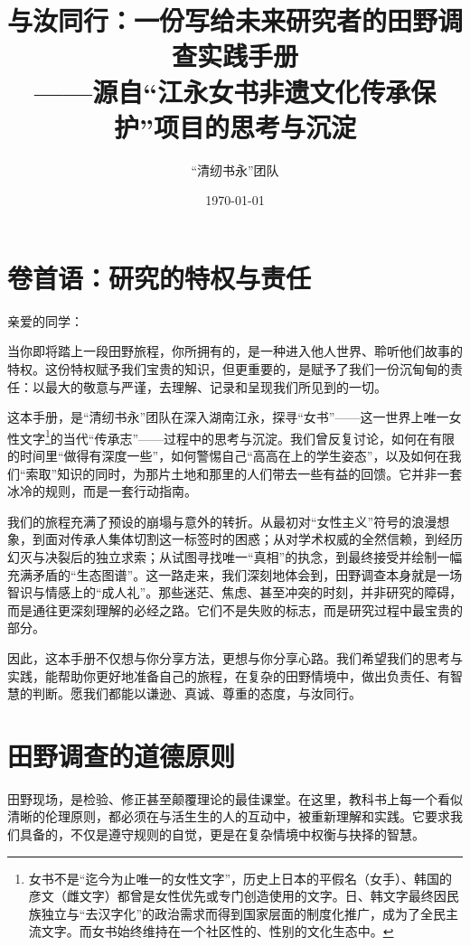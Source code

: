 \documentclass[UTF8]{ctexart}
\title{\bfseries 与汝同行：一份写给未来研究者的田野调查实践手册 \\ \large \vspace{0.5cm} ——源自“江永女书非遗文化传承保护”项目的思考与沉淀}
\author{“清纫书永”团队}
\date{\today}
\begin{document}
\maketitle
\thispagestyle{empty} 
\newpage

\tableofcontents 
\newpage

\section*{卷首语：研究的特权与责任}

亲爱的同学：

当你即将踏上一段田野旅程，你所拥有的，是一种进入他人世界、聆听他们故事的特权。这份特权赋予我们宝贵的知识，但更重要的，是赋予了我们一份沉甸甸的责任：以最大的敬意与严谨，去理解、记录和呈现我们所见到的一切。

这本手册，是“清纫书永”团队在深入湖南江永，探寻“女书”——这一世界上唯一女性文字\footnote{女书不是“迄今为止唯一的女性文字”，历史上日本的平假名（女手）、韩国的彦文（雌文字）都曾是女性优先或专门创造使用的文字。日、韩文字最终因民族独立与“去汉字化”的政治需求而得到国家层面的制度化推广，成为了全民主流文字。而女书始终维持在一个社区性的、性别的文化生态中。}的当代“传承志”——过程中的思考与沉淀。我们曾反复讨论，如何在有限的时间里“做得有深度一些”，如何警惕自己“高高在上的学生姿态”，以及如何在我们“索取”知识的同时，为那片土地和那里的人们带去一些有益的回馈。它并非一套冰冷的规则，而是一套行动指南。

我们的旅程充满了预设的崩塌与意外的转折。从最初对“女性主义”符号的浪漫想象，到面对传承人集体切割这一标签时的困惑；从对学术权威的全然信赖，到经历幻灭与决裂后的独立求索；从试图寻找唯一“真相”的执念，到最终接受并绘制一幅充满矛盾的“生态图谱”。这一路走来，我们深刻地体会到，田野调查本身就是一场智识与情感上的“成人礼”。那些迷茫、焦虑、甚至冲突的时刻，并非研究的障碍，而是通往更深刻理解的必经之路。它们不是失败的标志，而是研究过程中最宝贵的部分。

因此，这本手册不仅想与你分享方法，更想与你分享心路。我们希望我们的思考与实践，能帮助你更好地准备自己的旅程，在复杂的田野情境中，做出负责任、有智慧的判断。愿我们都能以谦逊、真诚、尊重的态度，与汝同行。

\newpage

\section{田野调查的道德原则}

田野现场，是检验、修正甚至颠覆理论的最佳课堂。在这里，教科书上每一个看似清晰的伦理原则，都必须在与活生生的人的互动中，被重新理解和实践。它要求我们具备的，不仅是遵守规则的自觉，更是在复杂情境中权衡与抉择的智慧。
\end{document}
